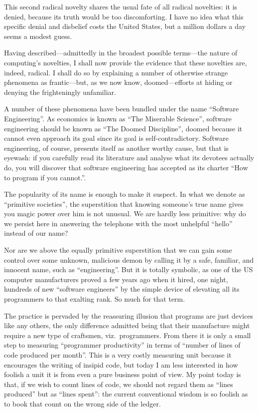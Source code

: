 \documentclass[a4paper,12pt]{article}
\begin{document}
This second radical novelty shares the usual fate of all radical
novelties: it is denied, because its truth would be too discomforting.
I have no idea what this specific denial and disbelief costs the United
States, but a million dollars a day seems a modest guess.

Having described---admittedly in the broadest possible terms---the
nature of computing's novelties, I shall now provide the evidence that
these novelties are, indeed, radical.  I shall do so by explaining a
number of otherwise strange phenomena as frantic---but, as we now know,
doomed---efforts at hiding or denying the frighteningly unfamiliar.

A number of these phenomena have been bundled under the name ``Software
Engineering''.  As economics is known as ``The Miserable Science'',
software engineering should be known as ``The Doomed Discipline'',
doomed because it cannot even approach its goal since its goal is
self-contradictory.  Software engineering, of course, presents itself as
another worthy cause, but that is eyewash: if you carefully read its
literature and analyse what its devotees actually do, you will discover
that software engineering has accepted as its charter ``How to program
if you cannot.''.

The popularity of its name is enough to make it suspect.  In what we
denote as ``primitive societies'', the superstition that knowing
someone's true name gives you magic power over him is not unusual.  We
are hardly less primitive: why do we persist here in answering the
telephone with the most unhelpful ``hello'' instead of our name?

Nor are we above the equally primitive superstition that we can gain
some control over some unknown, malicious demon by calling it by a safe,
familiar, and innocent name, such as ``engineering''.  But it is totally
symbolic, as one of the US computer manufacturers proved a few years ago
when it hired, one night, hundreds of new ``software engineers'' by the
simple device of elevating all its programmers to that exalting rank.
So much for that term.

The practice is pervaded by the reassuring illusion that programs are
just devices like any others, the only difference admitted being that
their manufacture might require a new type of craftsmen, viz.\
programmers.  From there it is only a small step to measuring
``programmer productivity'' in terms of ``number of lines of code
produced per month''.  This is a very costly measuring unit because it
encourages the writing of insipid code, but today I am less interested
in how foolish a unit it is from even a pure business point of view.  My
point today is that, if we wish to count lines of code, we should not
regard them as ``lines produced'' but as ``lines spent'': the current
conventional wisdom is so foolish as to book that count on the wrong
side of the ledger.
\end{document}
